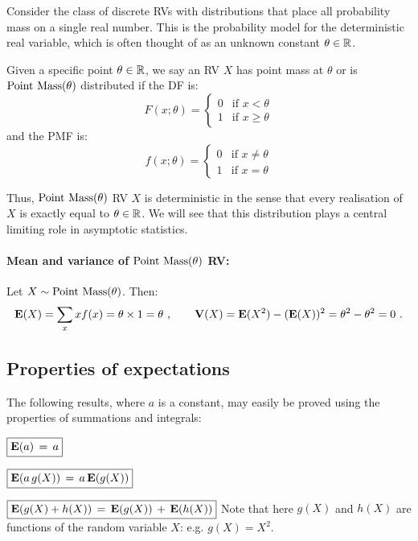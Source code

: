 Consider the class of discrete RVs with distributions that place all probability mass on a single real number.  
This is the probability model for the deterministic real variable, which is often thought of as an unknown constant $\theta \in \mathbb{R}$.
\begin{model}[$\pointmass(\theta)$]
Given a specific point $\theta \in \mathbb{R}$, we say an RV $X$ has point mass at $\theta$ or is $\pointmass(\theta)$ distributed if the DF is:
\begin{equation}\label{E:PointMasscdf}
F(x;\theta) =
\begin{cases}
0 & \text{if $x < \theta$} \\
1 & \text{if $x \geq \theta$}
\end{cases}
\end{equation}
and the PMF is:
\begin{equation}
f(x;\theta) =
\begin{cases}
0 & \text{if  $x \neq \theta$} \\
1 & \text{if $x = \theta$}
\end{cases}
\end{equation}
\end{model}
Thus, $\pointmass(\theta)$ RV $X$ is deterministic in the sense that every realisation of $X$ is exactly equal to $\theta \in \mathbb{R}$.  We will see that this distribution plays a central limiting role in asymptotic statistics.
\paragraph{Mean and variance of $\pointmass(\theta)$ RV:}
Let $X \sim \mbox{{\rm Point~Mass}}(\theta)$.  Then:
\[
\mathbf{E}(X) = \sum_{x} x f(x) = \theta \times 1 = \theta \ , \qquad
\mathbf{V}(X) = \mathbf{E}(X^2) - (\mathbf{E}(X))^2 = \theta^2 - \theta^2 = 0 \ .
\]

\subsection*{Properties of expectations}
The following results, where $a$ is a  constant, may easily be
proved using the properties of summations and integrals:

\bit
\item[] $\boxed{\mathbf{E}(a ) \,=\, a}$

\item[] $\boxed{\mathbf{E}(a \,g(X)) \,=\, a\, \mathbf{E}(g(X))}$

\item[] $\boxed{\mathbf{E}(g(X)+h(X))  \,=\, \mathbf{E}(g(X)) \,+\, \mathbf{E}(h(X))}$
\eit
Note that here  $g(X)$ and $h(X)$ are functions of the random variable
$X$: e.g.  $g(X)=X^2$.

